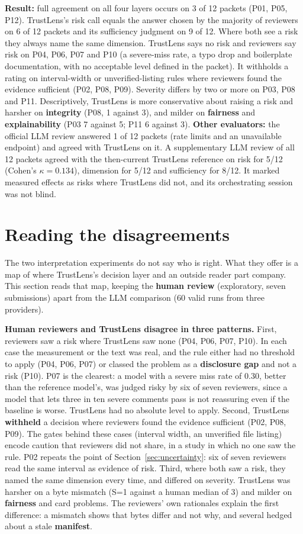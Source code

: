 \textbf{Result:} full agreement on all four layers occurs on 3 of 12 packets (P01, P05, P12). TrustLens's risk call equals the answer chosen by the majority of reviewers on 6 of 12 packets and its sufficiency judgment on 9 of 12. Where both see a risk they always name the same dimension. TrustLens says no risk and reviewers say risk on P04, P06, P07 and P10 (a severe-miss rate, a typo drop and boilerplate documentation, with no acceptable level defined in the packet). It withholds a rating on interval-width or unverified-listing rules where reviewers found the evidence sufficient (P02, P08, P09). Severity differs by two or more on P03, P08 and P11. Descriptively, TrustLens is more conservative about raising a risk and harsher on \textbf{integrity} (P08, 1 against 3), and milder on \textbf{fairness} and \textbf{explainability} (P03 7 against 5; P11 6 against 3). \textbf{Other evaluators:} the official LLM review answered 1 of 12 packets (rate limits and an unavailable endpoint) and agreed with TrustLens on it. A supplementary LLM review of all 12 packets agreed with the then-current TrustLens reference on risk for 5/12 (Cohen's $\kappa=0.134$), dimension for 5/12 and sufficiency for 8/12. It marked measured effects as risks where TrustLens did not, and its orchestrating session was not blind.

\section{Reading the disagreements}\label{sec:disagree}
The two interpretation experiments do not say who is right. What they offer is a map of where TrustLens's decision layer and an outside reader part company. This section reads that map, keeping the \textbf{human review} (exploratory, seven submissions) apart from the LLM comparison (60 valid runs from three providers).

\textbf{Human reviewers and TrustLens disagree in three patterns.} First, reviewers saw a risk where TrustLens saw none (P04, P06, P07, P10). In each case the measurement or the text was real, and the rule either had no threshold to apply (P04, P06, P07) or classed the problem as a \textbf{disclosure gap} and not a risk (P10). P07 is the clearest: a model with a severe miss rate of 0.30, better than the reference model's, was judged risky by six of seven reviewers, since a model that lets three in ten severe comments pass is not reassuring even if the baseline is worse. TrustLens had no absolute level to apply. Second, TrustLens \textbf{withheld} a decision where reviewers found the evidence sufficient (P02, P08, P09). The gates behind these cases (interval width, an unverified file listing) encode caution that reviewers did not share, in a study in which no one saw the rule. P02 repeats the point of Section~\ref{sec:uncertainty}: six of seven reviewers read the same interval as evidence of risk. Third, where both saw a risk, they named the same dimension every time, and differed on severity. TrustLens was harsher on a byte mismatch (S=1 against a human median of 3) and milder on \textbf{fairness} and card problems. The reviewers' own rationales explain the first difference: a mismatch shows that bytes differ and not why, and several hedged about a stale \textbf{manifest}.

